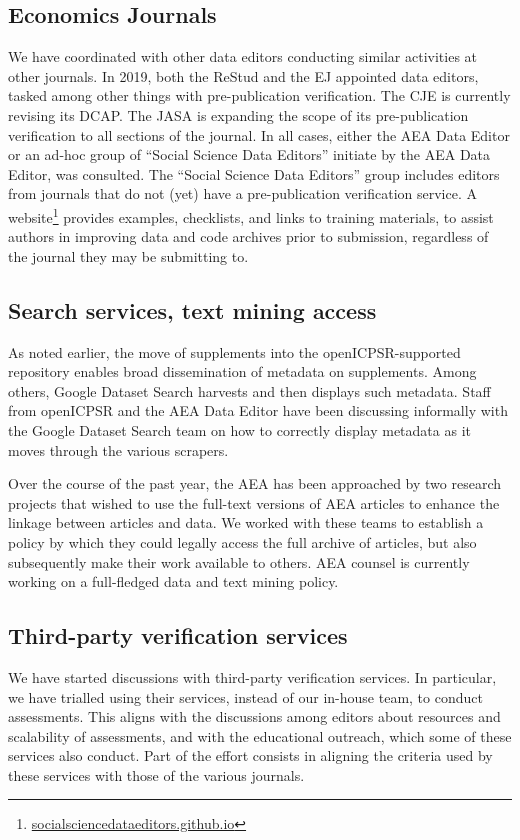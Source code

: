 \documentclass[PP]{AEA}
\newcommand{\urlcite}[2]{#2\footnote{\url{#1}}}
\begin{document}
\subsection{Economics Journals}

We have coordinated with other data editors conducting similar activities at other journals. In 2019, both the \ac{ReStud} and the \ac{EJ}  appointed data editors, tasked among other things with pre-publication verification. The \ac{CJE} is currently revising its \ac{DCAP}. The \ac{JASA} is expanding the scope of its pre-publication verification to all sections of the journal. In all cases, either the AEA Data Editor or an ad-hoc group of ``Social Science Data Editors'' initiate by the AEA Data Editor, was consulted. The ``Social Science Data Editors'' group includes  editors from journals that do not (yet) have a pre-publication verification service. A  \urlcite{socialsciencedataeditors.github.io}{website} provides examples, checklists, and links to training materials, to assist authors in  improving data and code archives prior to submission, regardless of the journal they may be submitting to.

\subsection{Search services, text mining access}
As noted earlier, the move of supplements into the openICPSR-supported repository enables broad dissemination of metadata on supplements. Among others, Google Dataset Search harvests and then displays such metadata. Staff from openICPSR and the AEA Data Editor have been discussing informally with the Google Dataset Search team on how to correctly display metadata as it moves through the various scrapers. 

Over the course of the past year, the AEA has been approached by two research projects that wished to use the full-text versions of AEA articles to enhance the linkage between articles and data. We worked with these teams to establish a policy by which they could legally access the full archive of articles, but also subsequently make their work available to others. AEA counsel is currently working on a full-fledged data and text mining policy.

\subsection{Third-party verification services}
We have started discussions with third-party verification services. In particular, we have trialled using their services, instead of our in-house team, to conduct assessments. This aligns with the discussions among editors about resources and scalability of assessments, and with the educational outreach, which some of these services also conduct. Part of the effort consists in aligning the criteria used by these services with those of the various journals.
\end{document}
